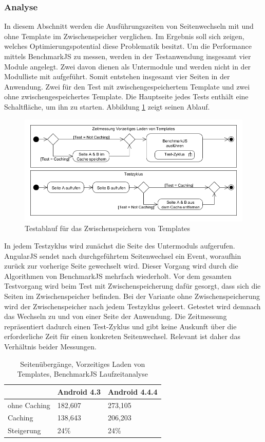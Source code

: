 \subsubsection{Analyse}
In diesem Abschnitt werden die Ausführungszeiten von Seitenwechseln mit und ohne Template im Zwischenspeicher verglichen. Im Ergebnis soll sich zeigen, welches Optimierungspotential diese Problematik besitzt. Um die Performance mittels BenchmarkJS zu messen, werden in der Testanwendung insgesamt vier Module angelegt. Zwei davon dienen als Untermodule und werden nicht in der Modulliste mit aufgeführt. Somit entstehen insgesamt vier Seiten in der Anwendung. Zwei für den Test mit zwischengespeichertem Template und zwei ohne zwischengespeichertes Template. Die Hauptseite jedes Tests enthält eine Schaltfläche, um ihn zu starten. Abbildung \ref{test-templateprefetching} zeigt seinen Ablauf.
\begin{figure}[h]
	\centering
	\includegraphics[scale=0.5]{Bilder/Testablauf-TemplatePrefetching.png}
	\caption{Testablauf für das Zwischenspeichern von Templates}
	\label{test-templateprefetching}
\end{figure}
In jedem Testzyklus wird zunächst die Seite des Untermoduls aufgerufen. AngularJS sendet nach durchgeführtem Seitenwechsel ein Event, woraufhin zurück zur vorherige Seite gewechselt wird. Dieser Vorgang wird durch die Algorithmen von BenchmarkJS mehrfach wiederholt. Vor dem gesamten Testvorgang wird beim Test mit Zwischenspeicherung dafür gesorgt, dass sich die Seiten im Zwischenspeicher befinden. Bei der Variante ohne Zwischenspeicherung wird der Zwischenspeicher nach jedem Testzyklus geleert. Getestet wird demnach das Wechseln zu und von einer Seite der Anwendung. Die Zeitmessung repräsentiert dadurch einen Test-Zyklus und gibt keine Auskunft über die erforderliche Zeit für einen konkreten Seitenwechsel. Relevant ist daher das Verhältnis beider Messungen. 
\begin{table}[h]
	\centering
\begin{tabular}{|l|l|l|}
	\hline
	\rowcolor[HTML]{C0C0C0} 
	\textbf{} & \textbf{Android 4.3} & \textbf{Android 4.4.4} \\ \hline
	ohne Caching & 182,607 & 273,105 \\ \hline
	Caching & 138,643 & 206,203 \\ \hline
	Steigerung & 24\% & 24\% \\ \hline
\end{tabular}
	\caption{Seitenübergänge, Vorzeitiges Laden von Templates, BenchmarkJS Laufzeitanalyse}
	\label{su-template-prefetching-benchjs-analyse}	
\end{table}
